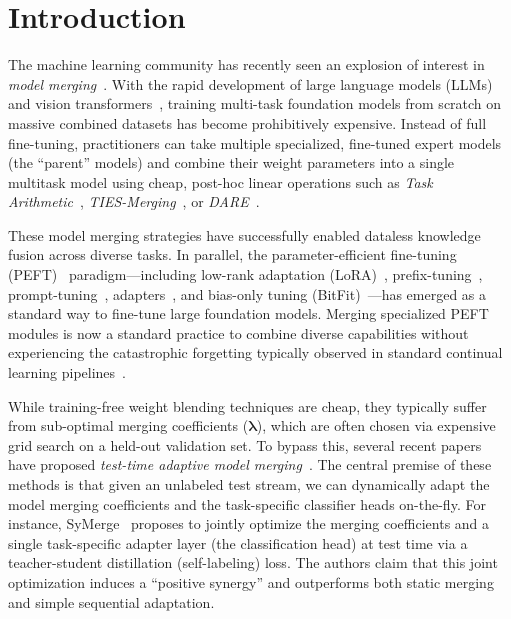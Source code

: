 \documentclass{article}
\theoremstyle{plain}
\theoremstyle{definition}
\theoremstyle{remark}
\begin{document}
\section{Introduction}
\label{sec:intro}

The machine learning community has recently seen an explosion of interest in \emph{model merging}~\cite{chhanabhai2024survey, yang2026ModelMergingSurvey}. With the rapid development of large language models (LLMs)~\cite{devlin2018bert, brown2020language, touvron2023llama} and vision transformers~\cite{dosovitskiy2020image}, training multi-task foundation models from scratch on massive combined datasets has become prohibitively expensive. Instead of full fine-tuning, practitioners can take multiple specialized, fine-tuned expert models (the ``parent'' models) and combine their weight parameters into a single multitask model using cheap, post-hoc linear operations such as \emph{Task Arithmetic}~\cite{ilharco2023editing}, \emph{TIES-Merging}~\cite{yadav2023ties}, or \emph{DARE}~\cite{yu2024dare}. 

These model merging strategies have successfully enabled dataless knowledge fusion across diverse tasks. In parallel, the parameter-efficient fine-tuning (PEFT)~\cite{mangrulkar2022peft} paradigm—including low-rank adaptation (LoRA)~\cite{hu2022lora}, prefix-tuning~\cite{li2021prefix}, prompt-tuning~\cite{lester2021power}, adapters~\cite{houlsby2019parameter}, and bias-only tuning (BitFit)~\cite{ben-zaken-etal-2022-bitfit}—has emerged as a standard way to fine-tune large foundation models. Merging specialized PEFT modules is now a standard practice to combine diverse capabilities without experiencing the catastrophic forgetting typically observed in standard continual learning pipelines~\cite{kirkpatrick2017overcoming, lopez2017gradient, schwarz2018progress, lazaridou2020continual}.

While training-free weight blending techniques are cheap, they typically suffer from sub-optimal merging coefficients ($\boldsymbol{\lambda}$), which are often chosen via expensive grid search on a held-out validation set. To bypass this, several recent papers have proposed \emph{test-time adaptive model merging}~\cite{symerge}. The central premise of these methods is that given an unlabeled test stream, we can dynamically adapt the model merging coefficients and the task-specific classifier heads on-the-fly. For instance, SyMerge~\cite{symerge} proposes to jointly optimize the merging coefficients and a single task-specific adapter layer (the classification head) at test time via a teacher-student distillation (self-labeling) loss. The authors claim that this joint optimization induces a ``positive synergy'' and outperforms both static merging and simple sequential adaptation.
\end{document}
